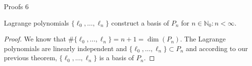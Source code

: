 \documentclass[8pt]{beamer}
\begin{document}
											\begin{frame}{Proofs 6}
												\begin{theorem}
													Lagrange polynomials $\{\ell_0,\ldots, \ell_n\}$ construct a basis of $P_n$ for $n \in \mathbb{N}_0: n < \infty$.
												\end{theorem}
												\begin{proof}
													We know that $\#\{\ell_0,\ldots, \ell_n\} = n+1 = \dim(P_n)$. The Lagrange polynomials are linearly independent and $\{\ell_0,\ldots, \ell_n\} \subset P_n$ and according to our previous theorem, $\{\ell_0,\ldots, \ell_n\}$ is a basis of $P_n$.
												\end{proof}
											\end{frame}
													
												
\end{document}
